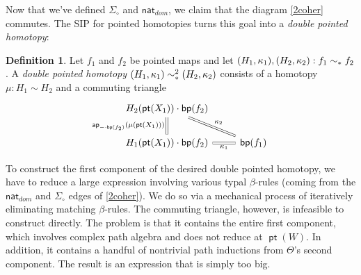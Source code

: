 \documentclass[10pt,a4paper]{article}
\theoremstyle{definition}
\newtheorem{defi}[thm]{Definition}
\theoremstyle{remark}
\newcommand{\dom}{\textit{dom}}
\newcommand{\nat}{\mathsf{nat}}
\newcommand{\0}{\mathbf{0}}
\newcommand{\1}{\mathbf{1}}
\newcommand{\2}{\mathbf{2}}
\DeclareMathOperator{\ap}{\mathsf{ap}}
\DeclareMathOperator{\bp}{\mathsf{bp}}
\DeclareMathOperator{\pt}{\mathsf{pt}}
\begin{document}
Now that we've defined $\Sigma_{\circ}$ and $\nat_{\dom}$, we claim that the diagram \eqref{2coher} commutes. The SIP for pointed homotopies turns this goal into a \emph{double pointed homotopy}:
\begin{defi}
  Let $f_1$ and $f_2$ be pointed maps and let $\mleft(H_1, \kappa_1\mright), \mleft(H_2, \kappa_2\mright) : f_1 \sim_{\ast} f_2$. A \emph{double pointed homotopy} $\mleft(H_1, \kappa_1\mright) \sim_{\ast}^2 \mleft(H_2, \kappa_2\mright)$ consists of a homotopy $\mu : H_1 \sim H_2$ and a commuting triangle 
\[\begin{tikzcd}
	{H_2(\pt(X_1)) \cdot \bp(f_2)} \\
	{H_1(\pt(X_1)) \cdot \bp(f_2)} & {\bp(f_1)}
	\arrow["{\ap_{{-} \cdot \bp(f_2)}(\mu(\pt(X_1)))}"', equals, from=1-1, to=2-1]
	\arrow["{\kappa_2}", equals, from=1-1, to=2-2]
	\arrow["{\kappa_1}"', equals, from=2-1, to=2-2]
\end{tikzcd}\]
\end{defi}

To construct the first component of the desired double pointed homotopy, we have to reduce a large expression involving various typal $\beta$-rules (coming from the $\nat_{\dom}$ and $\Sigma_{\circ}$ edges of \eqref{2coher}). We do so via a mechanical process of iteratively eliminating matching $\beta$-rules. The commuting triangle, however, is infeasible to construct directly. The problem is that it contains the entire first component, which involves complex path algebra and does not reduce at $\pt(W)$. In addition, it contains a handful of nontrivial path inductions from $\Theta$'s second component. The result is an expression that is simply too big.
\end{document}
